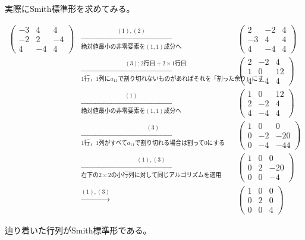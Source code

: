 \documentclass[uplatex]{jsarticle}
\begin{document}
\begin{rei}
  実際にSmith標準形を求めてみる。
  \begin{center}
    $\begin{array}{ccc}
      \begin{pmatrix}
        -3 & 4 & 4 \\ -2 & 2 & -4 \\ 4 & -4 & 4
      \end{pmatrix} & \xrightarrow[\text{絶対値最小の非零要素を$(1,1)$成分へ}]{(1),(2)}
      & \begin{pmatrix}
        2 & -2 & 4 \\ -3 & 4 & 4 \\ 4 & -4 & 4
      \end{pmatrix} \\ & \xrightarrow[\text{1行，1列に$a_{11}$で割り切れないものがあればそれを「割った余り」にする}]{(3); 2 \text{行目} + 2 \times 1 \text{行目}}
      & \begin{pmatrix}
        2 & -2 & 4 \\ 1 & 0 & 12 \\ 4 & -4 & 4
      \end{pmatrix} \\ & \xrightarrow[\text{絶対値最小の非零要素を$(1,1)$成分へ}]{(1)}
      & \begin{pmatrix}
        1 & 0 & 12 \\ 2 & -2 & 4 \\ 4 & -4 & 4
      \end{pmatrix} \\ & \xrightarrow[\text{1行，1列がすべて$a_{11}$で割り切れる場合は割って0にする}]{(3)}
      & \begin{pmatrix}
        1 & 0 & 0 \\ 0 & -2 & -20 \\ 0 & -4 & -44
      \end{pmatrix} \\ & \xrightarrow[\text{右下の$2 \times 2$の小行列に対して同じアルゴリズムを適用}]{(1),(3)}
      & \begin{pmatrix}
        1 & 0 & 0 \\ 0 & 2 & -20 \\ 0 & 0 & -4
      \end{pmatrix} \\ & \xrightarrow{(1),(3)}
      & \begin{pmatrix}
        1 & 0 & 0 \\ 0 & 2 & 0 \\ 0 & 0 & 4
      \end{pmatrix}
    \end{array}$
  \end{center}
  辿り着いた行列がSmith標準形である。
\end{rei}
\end{document}
